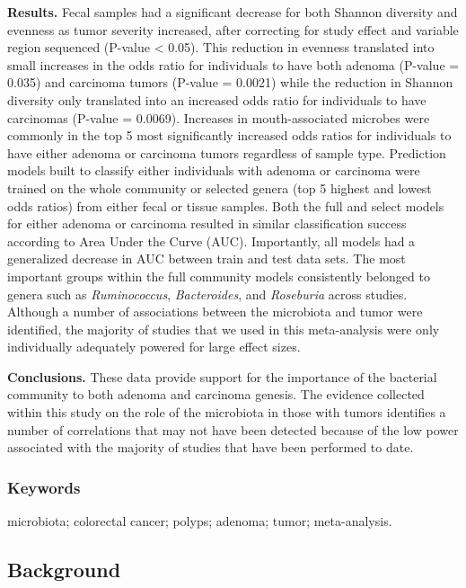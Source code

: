 \documentclass[12pt,]{article}
\begin{document}
\textbf{Results.} Fecal samples had a significant decrease for both
Shannon diversity and evenness as tumor severity increased, after
correcting for study effect and variable region sequenced (P-value
\textless{} 0.05). This reduction in evenness translated into small
increases in the odds ratio for individuals to have both adenoma
(P-value = 0.035) and carcinoma tumors (P-value = 0.0021) while the
reduction in Shannon diversity only translated into an increased odds
ratio for individuals to have carcinomas (P-value = 0.0069). Increases
in mouth-associated microbes were commonly in the top 5 most
significantly increased odds ratios for individuals to have either
adenoma or carcinoma tumors regardless of sample type. Prediction models
built to classify either individuals with adenoma or carcinoma were
trained on the whole community or selected genera (top 5 highest and
lowest odds ratios) from either fecal or tissue samples. Both the full
and select models for either adenoma or carcinoma resulted in similar
classification success according to Area Under the Curve (AUC).
Importantly, all models had a generalized decrease in AUC between train
and test data sets. The most important groups within the full community
models consistently belonged to genera such as \emph{Ruminococcus},
\emph{Bacteroides}, and \emph{Roseburia} across studies. Although a
number of associations between the microbiota and tumor were identified,
the majority of studies that we used in this meta-analysis were only
individually adequately powered for large effect sizes.

\textbf{Conclusions.} These data provide support for the importance of
the bacterial community to both adenoma and carcinoma genesis. The
evidence collected within this study on the role of the microbiota in
those with tumors identifies a number of correlations that may not have
been detected because of the low power associated with the majority of
studies that have been performed to date.

\subsubsection{Keywords}\label{keywords}

microbiota; colorectal cancer; polyps; adenoma; tumor; meta-analysis.

\newpage

\subsection{Background}\label{background}
\end{document}
